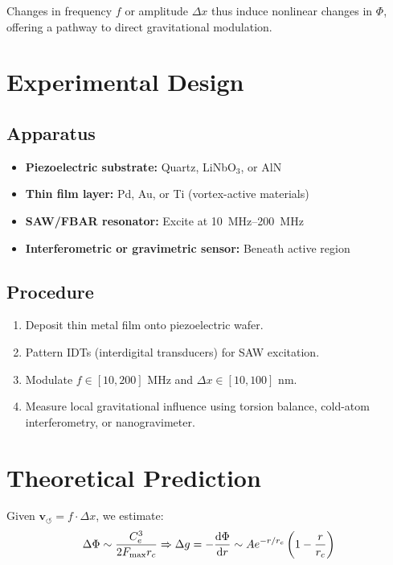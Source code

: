 \documentclass[preprint]{revtex4-2}
\begin{document}
    Changes in frequency \( f \) or amplitude \( \Delta x \) thus induce nonlinear changes in \( \Phi \), offering a pathway to direct gravitational modulation.

    \section*{Experimental Design}
    \subsection*{Apparatus}
    \begin{itemize}
        \item \textbf{Piezoelectric substrate:} Quartz, LiNbO$_3$, or AlN
        \item \textbf{Thin film layer:} Pd, Au, or Ti (vortex-active materials)
        \item \textbf{SAW/FBAR resonator:} Excite at \SI{10}{MHz}--\SI{200}{MHz}
        \item \textbf{Interferometric or gravimetric sensor:} Beneath active region
    \end{itemize}

    \subsection*{Procedure}
    \begin{enumerate}
        \item Deposit thin metal film onto piezoelectric wafer.
        \item Pattern IDTs (interdigital transducers) for SAW excitation.
        \item Modulate \( f \in [10, 200] \) MHz and \( \Delta x \in [10, 100] \) nm.
        \item Measure local gravitational influence using torsion balance, cold-atom interferometry, or nanogravimeter.
    \end{enumerate}

    \section*{Theoretical Prediction}
    Given \( \mathbf{v}_{\scriptscriptstyle\boldsymbol{\circlearrowleft}} = f \cdot \Delta x \), we estimate:
    \begin{equation}
        \Delta \Phi \sim \frac{C_e^3}{2 F_{\text{max}} r_c} \Rightarrow \Delta g = -\dv{\Phi}{r} \sim A e^{-r/r_c} \left(1 - \frac{r}{r_c}\right)
    \end{equation}
\end{document}

